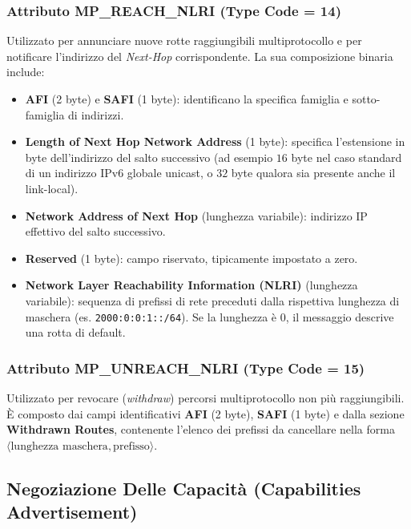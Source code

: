 \documentclass[11pt, a4paper]{article}
\begin{document}
\subsubsection{Attributo MP\_REACH\_NLRI (Type Code = 14)}
Utilizzato per annunciare nuove rotte raggiungibili multiprotocollo e per notificare l'indirizzo del \emph{Next-Hop} corrispondente. La sua composizione binaria include:
\begin{itemize}[noitemsep]
    \item \textbf{AFI} (2 byte) e \textbf{SAFI} (1 byte): identificano la specifica famiglia e sotto-famiglia di indirizzi.
    \item \textbf{Length of Next Hop Network Address} (1 byte): specifica l'estensione in byte dell'indirizzo del salto successivo (ad esempio $16$ byte nel caso standard di un indirizzo IPv6 globale unicast, o $32$ byte qualora sia presente anche il link-local).
    \item \textbf{Network Address of Next Hop} (lunghezza variabile): indirizzo IP effettivo del salto successivo.
    \item \textbf{Reserved} (1 byte): campo riservato, tipicamente impostato a zero.
    \item \textbf{Network Layer Reachability Information (NLRI)} (lunghezza variabile): sequenza di prefissi di rete preceduti dalla rispettiva lunghezza di maschera (es. \texttt{2000:0:0:1::/64}). Se la lunghezza è $0$, il messaggio descrive una rotta di default.
\end{itemize}

\subsubsection{Attributo MP\_UNREACH\_NLRI (Type Code = 15)}
Utilizzato per revocare (\emph{withdraw}) percorsi multiprotocollo non più raggiungibili. È composto dai campi identificativi \textbf{AFI} (2 byte), \textbf{SAFI} (1 byte) e dalla sezione \textbf{Withdrawn Routes}, contenente l'elenco dei prefissi da cancellare nella forma $\langle\text{lunghezza maschera}, \text{prefisso}\rangle$.


\subsection{Negoziazione Delle Capacità (Capabilities Advertisement)}
\end{document}
